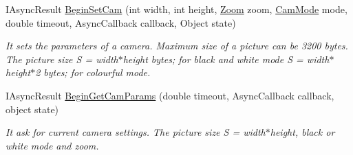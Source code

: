 \begin{DoxyCompactItemize}
  \item   IAsyncResult \hyperlink{class_elib_1_1_epuck_a55e442eec492fc282ae978b3ec1e78c2}{BeginSetCam} (int width, int height, \hyperlink{namespace_elib_af2af0734145f6e03503f2379f6249669}{Zoom} zoom, \hyperlink{namespace_elib_acc08cc9ecc6edea0df55bcb7a1529c17}{CamMode} mode, double timeout, AsyncCallback callback, Object state)
  \begin{DoxyCompactList}\small\item\em It sets the parameters of a camera. Maximum size of a picture can be 3200 bytes. The picture size S = width$\ast$height bytes; for black and white mode S = width$\ast$height$\ast$2 bytes; for colourful mode. \item\end{DoxyCompactList}

  \item   IAsyncResult \hyperlink{class_elib_1_1_epuck_aa9e87b03e5a8ec36db30b6340d0da861}{BeginGetCamParams} (double timeout, AsyncCallback callback, object state)
  \begin{DoxyCompactList}\small\item\em It ask for current camera settings. The picture size S = width$\ast$height, black or white mode and zoom. \item\end{DoxyCompactList}

  \end{DoxyCompactItemize}

